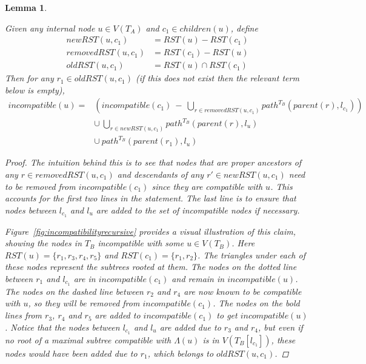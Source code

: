 \documentclass{article}
\newcommand{\leafset}{\Lambda}
\newtheorem{incompatibilityrecursive}[incompatibility]{Lemma}
\begin{document}
    \begin{incompatibilityrecursive}
        \label{lem:incompatibilityrecursive}

        Given any internal node $u \in V(T_A)$ and $c_1 \in children(u)$, define
        \begin{align*}
            newRST(u, c_1) &= RST(u) - RST(c_1)\\[0.5em]
            removedRST(u, c_1) &= RST(c_1) - RST(u)\\[0.5em]
            oldRST(u, c_1) &= RST(u) \cap RST(c_1)
        \end{align*}
        Then for any $r_1 \in oldRST(u, c_1)$ (if this does not exist then the relevant term below is empty),
        \begin{align*}
            incompatible(u) = &\left(incompatible(c_1)\ -\ \bigcup_{r \in removedRST(u, c_1)} path^{T_B}(parent(r), l_{c_1})\right)\\
            &\cup\ \bigcup_{r \in newRST(u, c_1)} path^{T_B}(parent(r), l_u)\\
            &\cup\ path^{T_B}(parent(r_1), l_u)
        \end{align*}

        \begin{proof}
            The intuition behind this is to see that nodes that are proper ancestors of any $r \in removedRST(u, c_1)$ and descendants of any $r' \in newRST(u, c_1)$ need to be removed from $incompatible(c_1)$ since they are compatible with $u$. This accounts for the first two lines in the statement. The last line is to ensure that nodes between $l_{c_1}$ and $l_u$ are added to the set of incompatible nodes if necessary.

            Figure~\ref{fig:incompatibilityrecursive} provides a visual illustration of this claim, showing the nodes in $T_B$ incompatible with some $u \in V(T_B)$. Here $RST(u) = \{r_1, r_3, r_4, r_5\}$ and $RST(c_1) = \{r_1, r_2\}$. The triangles under each of these nodes represent the subtrees rooted at them. The nodes on the dotted line between $r_1$ and $l_{c_1}$ are in $incompatible(c_1)$ and remain in $incompatible(u)$. The nodes on the dashed line between $r_2$ and $r_4$ are now known to be compatible with $u$, so they will be removed from $incompatible(c_1)$. The nodes on the bold lines from $r_3$, $r_4$ and $r_5$ are added to $incompatible(c_1)$ to get $incompatible(u)$. Notice that the nodes between $l_{c_1}$ and $l_u$ are added due to $r_3$ and $r_4$, but even if no root of a maximal subtree compatible with $\leafset(u)$ is in $V(T_B[l_{c_1}])$, these nodes would have been added due to $r_1$, which belongs to $oldRST(u, c_1)$.


\end{proof}
\end{incompatibilityrecursive}
\end{document}
